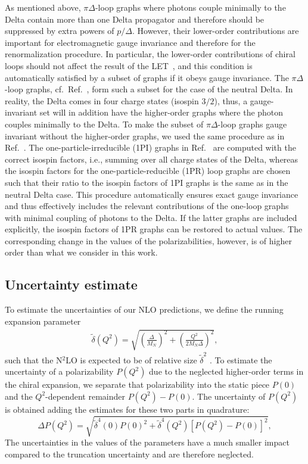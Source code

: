 \documentclass[12pt,preprint,tightenlines,
showpacs,preprintnumbers,amsmath,amssymb,
a4paper,nofootinbib]{revtex4-1}
\def\beq{\begin{equation}}
\def\eeq{\end{equation}}
\def\eqlab#1{\label{eq:#1}}
\begin{document}
As mentioned above, $\pi \Delta$-loop graphs where photons couple minimally to the Delta contain more 
than one Delta propagator and therefore should be suppressed by extra powers of $p/\varDelta$.
However, their lower-order contributions are important for electromagnetic gauge invariance and therefore for the 
renormalization procedure. In particular, the lower-order contributions of chiral loops should not affect the result of the LET~\cite{Low:1954kd, GellMann:1954kc}, and this condition is automatically satisfied by a subset of graphs if it obeys gauge invariance. The $\pi\Delta$-loop graphs, cf.\ Ref.~\cite[Fig.~2]{Lensky:2014dda}, form such a subset for the case of the neutral Delta. In reality, the Delta comes in four charge states (isospin $3/2$), thus, a 
gauge-invariant set will in addition have the higher-order graphs where the photon couples minimally to the Delta. To make the subset of $\pi\Delta$-loop graphs  gauge invariant without the higher-order graphs, we used the same procedure as in Ref.~\cite{Lensky:2009uv}. The one-particle-irreducible (1PI) graphs in Ref.~\cite[Fig.~2]{Lensky:2014dda} are computed with the correct isospin factors, i.e., summing over all charge 
states of the Delta, whereas the isospin factors for the one-particle-reducible (1PR) loop graphs are chosen such that their ratio to the isospin factors
of 1PI graphs is the same as in the neutral Delta case. This procedure automatically ensures exact gauge invariance and thus 
effectively includes the relevant contributions of the one-loop graphs with minimal coupling of photons to the Delta. If the latter graphs 
are included explicitly, the isospin factors of 1PR graphs can be restored to actual values.
The corresponding change in the values of the polarizabilities, however, is of higher order than what we consider in this work.





\subsection{Uncertainty estimate}

To estimate the uncertainties of our NLO predictions, we define the running expansion parameter
\begin{align}
 \tilde{\delta}(Q^2) = \sqrt{ \left(\frac{\varDelta}{M_N}\right)^2 + \left(\frac{Q^2}{2 M_N \varDelta}\right)^2 },\eqlab{dtilde}
\end{align}
such that the N$^2$LO is expected to be of relative size $\tilde{\delta}^2$ \cite{Pascalutsa:2005vq}.
To estimate the uncertainty of a polarizability $P(Q^2)$ due to the neglected higher-order terms in the
chiral expansion, we separate that polarizability into the static piece
$P(0)$ and the $Q^2$-dependent remainder $P(Q^2)-P(0)$. The uncertainty of $P(Q^2)$ is obtained adding the
estimates for these two parts in quadrature:
\beq
\Delta P(Q^2)= \sqrt{\tilde \delta^4(0) P(0)^2 +\tilde \delta^4(Q^2) \left[P(Q^2)-P(0)\right]^2},
\eeq
The uncertainties in the values of the parameters have a much smaller impact compared to the truncation
uncertainty and are therefore neglected.
\end{document}
